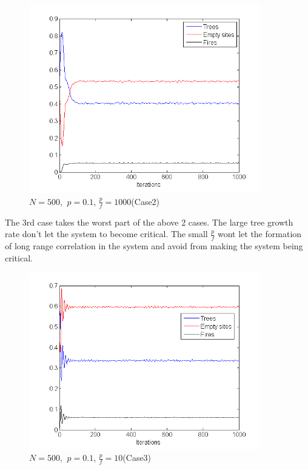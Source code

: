 \documentclass[11pt]{article}
\begin{document}
\begin{figure}[H]
\centering
\includegraphics[width=0.9\textwidth,keepaspectratio=true,]{Pictures/case2_size500_1000iter_p_0point1_ratio_1000.png}
\caption{$N=500$, $\ p=0.1$, $\frac{p}{f}=1000$(Case2)}
\end{figure}

The 3rd case takes the worst part of the above 2 cases. The large tree growth rate don't let the system to become critical. The small $\frac{p}{f}$ wont let the formation of long range correlation in the system and avoid from making the system being critical.\\
\begin{figure}[H]
\centering
\includegraphics[width=0.9\textwidth,keepaspectratio=true,]{Pictures/case3_size500_1000iter_p_0point1_ratio_10.png}
\caption{$N=500$, $\ p=0.1$, $\frac{p}{f}=10$(Case3)}
\end{figure}
\end{document}
